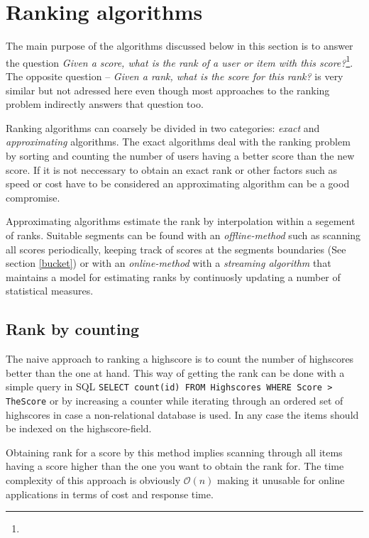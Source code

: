 \chapter{\label{ranking-algorithms}Ranking algorithms}

The main purpose of the algorithms discussed below in this section is to answer the question \emph{Given a score, what is the rank of a user or item with this score?}\footnote{}. The opposite question -- \emph{Given a rank, what is the score for this rank?} is very similar but not adressed here even though most approaches to the ranking problem indirectly answers that question too.

Ranking algorithms can coarsely be divided in two categories: \emph{exact} and \emph{approximating} algorithms. The exact algorithms deal with the ranking problem by sorting and counting the number of users having a better score than the new score. If it is not neccessary to obtain an exact rank or other factors such as speed or cost have to be considered an approximating algorithm can be a good compromise.

Approximating algorithms estimate the rank by interpolation within a segement of ranks. Suitable segments can be found with an \emph{offline-method} such as scanning all scores periodically, keeping track of scores at the segments boundaries (See section \ref{bucket}) or with an \emph{online-method} with a \emph{streaming algorithm} that maintains a model for estimating ranks by continuosly updating a number of statistical measures.

\section{\label{counting}Rank by counting}

The naive approach to ranking a highscore is to count the number of highscores better than the one at hand. This way of getting the rank can be done with a simple query in SQL
\texttt{SELECT count(id) FROM Highscores WHERE Score > TheScore} or by increasing a counter while iterating through an ordered set of highscores in case a non-relational database is used. In any case the items should be indexed on the highscore-field.

Obtaining rank for a score by this method implies scanning through all items having a score higher than the one you want to obtain the rank for. The time complexity of this approach is obviously $\mathcal{O}(n)$ making it unusable for online applications in terms of cost and response time.

